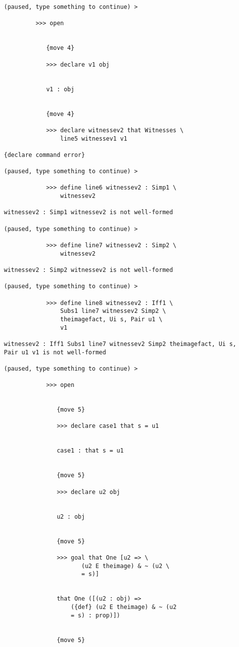 \documentclass[12pt]{article}
\begin{document}
\begin{verbatim}
(paused, type something to continue) >

         >>> open


            {move 4}

            >>> declare v1 obj


            v1 : obj


            {move 4}

            >>> declare witnessev2 that Witnesses \
                line5 witnessev1 v1

{declare command error}

(paused, type something to continue) >

            >>> define line6 witnessev2 : Simp1 \
                witnessev2

witnessev2 : Simp1 witnessev2 is not well-formed

(paused, type something to continue) >

            >>> define line7 witnessev2 : Simp2 \
                witnessev2

witnessev2 : Simp2 witnessev2 is not well-formed

(paused, type something to continue) >

            >>> define line8 witnessev2 : Iff1 \
                Subs1 line7 witnessev2 Simp2 \
                theimagefact, Ui s, Pair u1 \
                v1

witnessev2 : Iff1 Subs1 line7 witnessev2 Simp2 theimagefact, Ui s, Pair u1 v1 is not well-formed

(paused, type something to continue) >

            >>> open


               {move 5}

               >>> declare case1 that s = u1


               case1 : that s = u1


               {move 5}

               >>> declare u2 obj


               u2 : obj


               {move 5}

               >>> goal that One [u2 => \
                      (u2 E theimage) & ~ (u2 \
                      = s)]


               that One ([(u2 : obj) => 
                   ({def} (u2 E theimage) & ~ (u2 
                   = s) : prop)])


               {move 5}


\end{verbatim}
\end{document}
